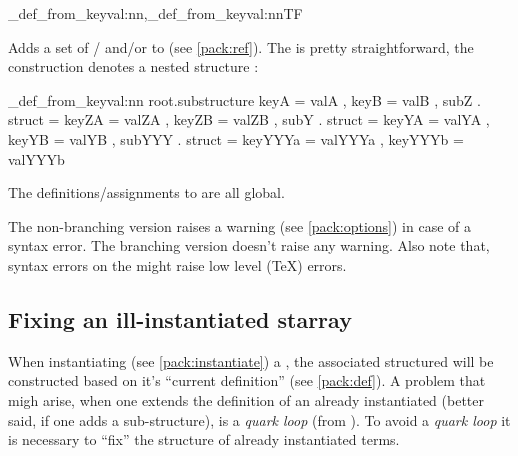 \documentclass[10pt]{article}
\begin{document}
\begin{codedescribe}{\starray_def_from_keyval:nn,\starray_def_from_keyval:nnTF}
\begin{codesyntax}%
\end{codesyntax}

Adds a set of  /  and/or  to  (see \ref{pack:ref}). The  is pretty straightforward, 
the construction  denotes a nested structure :
\end{codedescribe}

\begin{codestore}
\starray_def_from_keyval:nn {root.substructure} 
  {
    keyA = valA ,
    keyB = valB ,
    subZ . struct = 
      {
        keyZA = valZA ,
        keyZB = valZB ,
      }
    subY . struct =
      {
        keyYA = valYA ,
        keyYB = valYB ,
        subYYY . struct =
          {
            keyYYYa = valYYYa ,
            keyYYYb = valYYYb 
          }
      }
  }
\end{codestore}


The definitions/assignments  to  are all global.

\begin{tsremark}
The non-branching version raises a warning (see \ref{pack:options}) in case of a  syntax error. The branching version doesn't raise any warning. Also note that, syntax errors on the  might raise low level (\TeX) errors.
\end{tsremark}

\subsection{Fixing an ill-instantiated starray}\label{pack:def-fix}

When instantiating (see \ref{pack:instantiate}) a , the associated structured will be constructed based on it's ``current definition'' (see \ref{pack:def}). A problem that migh arise, when one extends the definition of an already instantiated   (better said, if one adds a sub-structure), is a \textsl{quark loop} (from ). To avoid a \textsl{quark loop} it is necessary to ``fix'' the structure of already instantiated terms.
\end{document}
